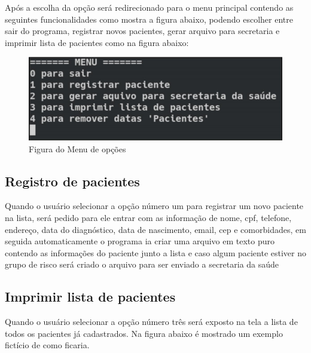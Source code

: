 \documentclass[
	12pt,				%
	oneside,			%
	a4paper,			%
  section=TITLE,
	brazil,				%
	]{abntex2}
\begin{document}
Após a escolha da opção será redirecionado para o menu principal contendo as
seguintes funcionalidades como mostra a figura abaixo, podendo escolher entre
sair do programa, registrar novos pacientes, gerar arquivo para secretaria e
imprimir lista de pacientes como na figura abaixo:

\begin{figure}[htb]
\caption{\label{fig_user_menu_options}Figura do Menu de opções}
\begin{center}
  \includegraphics[scale=3.00]{img/login-options.png}
\end{center}
\end{figure}

\subsection{Registro de pacientes}

Quando o usuário selecionar a opção número um para registrar um novo paciente
na lista, será pedido para ele entrar com as informação de nome, cpf, telefone,
endereço, data do diagnóstico, data de nascimento, email, cep e comorbidades,
em seguida automaticamente o programa ia criar uma arquivo em texto puro
contendo as informações do paciente junto a lista e caso algum paciente estiver
no grupo de risco será criado o arquivo para ser enviado a secretaria da saúde

\subsection{Imprimir lista de pacientes}

Quando o usuário selecionar a opção número três será exposto na tela a lista de
todos os pacientes já cadastrados. Na figura abaixo é mostrado um exemplo
fictício de como ficaria.
\end{document}
